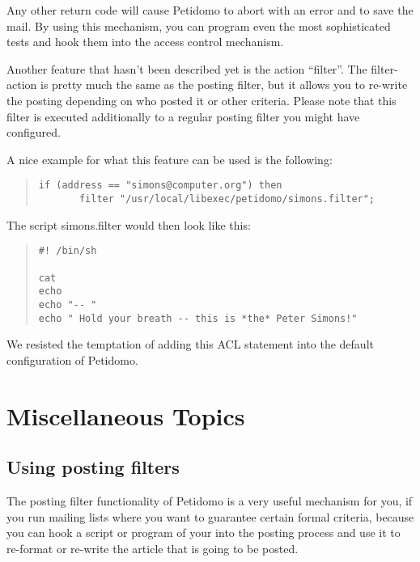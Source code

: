 \documentclass[a4paper,10pt]{scrreprt}
\newcommand{\file}[1]{{\sf #1}}
\begin{document}
Any other return code will cause Petidomo to abort with an error and
to save the mail. By using this mechanism, you can program even the
most sophisticated tests and hook them into the access control
mechanism.

Another feature that hasn't been described yet is the action
``filter''. The filter-action is pretty much the same as the posting
filter, but it allows you to re-write the posting depending on who
posted it or other criteria. Please note that this filter is executed
additionally to a regular posting filter you might have configured.

A nice example for what this feature can be used is the following:
\begin{quote}
\begin{verbatim}
if (address == "simons@computer.org") then
       filter "/usr/local/libexec/petidomo/simons.filter";
\end{verbatim}
\end{quote}

The script \file{simons.filter} would then look like this:
\begin{quote}
\begin{verbatim}
#! /bin/sh

cat
echo
echo "-- "
echo " Hold your breath -- this is *the* Peter Simons!"
\end{verbatim}
\end{quote}

We resisted the temptation of adding this ACL statement into the
default configuration of Petidomo.

%
\chapter{Miscellaneous Topics}
\section{Using posting filters}
\label{using posting filters}

The posting filter functionality of Petidomo is a very useful
mechanism for you, if you run mailing lists where you want to
guarantee certain formal criteria, because you can hook a script or
program of your into the posting process and use it to re-format or
re-write the article that is going to be posted.
\end{document}
